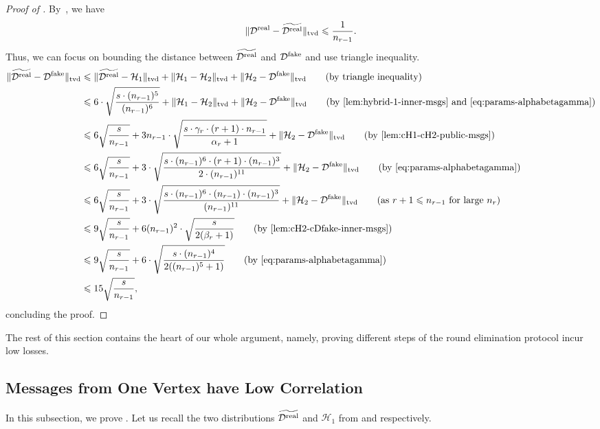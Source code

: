 \documentclass[11pt]{article}
\theoremstyle{definition}
\renewcommand{\leq}{\leqslant}
\newcommand{\tvd}[2]{\ensuremath{\norm{#1 - #2}_{\mathrm{tvd}}}}
\newcommand{\norm}[1]{\ensuremath{\|#1\|}}
\newcommand{\cH}{\ensuremath{\mathcal{H}}}
\newcommand{\cD}{\ensuremath{\mathcal{D}}}
\newcommand{\cDreal}{\ensuremath{\cD^{\textnormal{real}}}}
\newcommand{\cDrealtil}{\ensuremath{\widetilde{\cDreal}}}
\newcommand{\cDfake}{\ensuremath{\cD^{\textnormal{fake}}}}
\begin{document}
\begin{proof}[Proof of ]
	By~, we have
	\[
		\tvd{\cDreal}{\cDrealtil} \leq \frac1{n_{r-1}}.
	\]
	Thus, we can focus on bounding the distance between  $\cDrealtil$ and $\cDfake$ and use triangle inequality.  
	\begin{align*}
		\tvd{\cDrealtil}{\cDfake} &\leq \tvd{\cDrealtil}{\cH_1} + \tvd{\cH_1}{\cH_2} + \tvd{\cH_2}{\cDfake} \tag{by triangle inequality} \\
		&\leq 6 \cdot \sqrt{\frac{s \cdot (n_{r-1})^5}{ (n_{r-1})^6}} +  \tvd{\cH_1}{\cH_2} + \tvd{\cH_2}{\cDfake} \tag{by \Cref{lem:hybrid-1-inner-msgs} and \Cref{eq:params-alphabetagamma}} \\
		&\leq 6 \sqrt{\frac{s}{n_{r-1}}} + 3n_{r-1}  \cdot \sqrt{\frac{s \cdot \gamma_r  \cdot (r+1) \cdot n_{r-1}}{\alpha_r + 1}} + \tvd{\cH_2}{\cDfake} \tag{by \Cref{lem:cH1-cH2-public-msgs}} \\
		&\leq 6 \sqrt{\frac{s}{n_{r-1}}} + 3  \cdot \sqrt{\frac{s \cdot(n_{r-1})^6  \cdot (r+1) \cdot (n_{r-1})^3}{2 \cdot (n_{r-1})^{11}}}  + \tvd{\cH_2}{\cDfake}  \tag{by \Cref{eq:params-alphabetagamma}} \\
		&\leq  6 \sqrt{\frac{s}{n_{r-1}}} + 3  \cdot \sqrt{\frac{ s \cdot(n_{r-1})^6 \cdot (n_{r-1}) \cdot (n_{r-1})^3}{ (n_{r-1})^{11}}}  + \tvd{\cH_2}{\cDfake} \tag{as $ r + 1 \leq n_{r-1}$ for large $n_r$} \\
		& \leq 9 \sqrt{\frac{s}{n_{r-1}}} +   6(n_{r-1})^2 \cdot  \sqrt{\frac{s}{2(\beta_r + 1)}} \tag{by \Cref{lem:cH2-cDfake-inner-msgs}} \\
		&\leq  9 \sqrt{\frac{s}{n_{r-1}}} + 6 \cdot  \sqrt{\frac{s \cdot (n_{r-1})^4}{2((n_{r-1})^5+ 1)}} \tag{by \Cref{eq:params-alphabetagamma}} \\
		&\leq 15 \sqrt{\frac{s}{n_{r-1}}},
	\end{align*}
	concluding the proof. 
\end{proof}
The rest of this section contains the heart of our whole argument, namely, proving different steps of the round elimination protocol incur low losses. 

\subsection{Messages from One Vertex have Low Correlation}\label{subsec:msgs-low-correlation}
In this subsection, we prove .
Let us recall the two distributions $\cDrealtil$ and $\cH_1$ from  and  respectively. 
\end{document}
